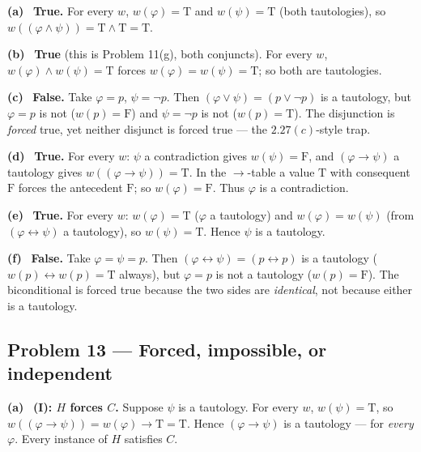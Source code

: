 \documentclass[11pt]{article}
\newcommand{\T}{\mathrm{T}}
\newcommand{\F}{\mathrm{F}}
\newcommand{\solpart}[1]{\smallskip\noindent\textbf{(#1)}\ }
\newcommand{\prob}[2]{\subsection*{Problem #1 --- #2}}
\begin{document}
\solpart{a} \textbf{True.} For every $w$, $w(\varphi)=\T$ and $w(\psi)=\T$ (both
tautologies), so $w((\varphi\land\psi))=\T\land\T=\T$.

\solpart{b} \textbf{True} (this is Problem 11(g), both conjuncts). For every $w$,
$w(\varphi)\land w(\psi)=\T$ forces $w(\varphi)=w(\psi)=\T$; so both are tautologies.

\solpart{c} \textbf{False.} Take $\varphi=p$, $\psi=\lnot p$. Then $(\varphi\lor
\psi)=(p\lor\lnot p)$ is a tautology, but $\varphi=p$ is not ($w(p)=\F$) and
$\psi=\lnot p$ is not ($w(p)=\T$). The disjunction is \emph{forced} true, yet
neither disjunct is forced true --- the $2.27(c)$-style trap.

\solpart{d} \textbf{True.} For every $w$: $\psi$ a contradiction gives $w(\psi)=\F$,
and $(\varphi\to\psi)$ a tautology gives $w((\varphi\to\psi))=\T$. In the
$\to$-table a value $\T$ with consequent $\F$ forces the antecedent $\F$; so
$w(\varphi)=\F$. Thus $\varphi$ is a contradiction.

\solpart{e} \textbf{True.} For every $w$: $w(\varphi)=\T$ ($\varphi$ a tautology)
and $w(\varphi)=w(\psi)$ (from $(\varphi\leftrightarrow\psi)$ a tautology), so
$w(\psi)=\T$. Hence $\psi$ is a tautology.

\solpart{f} \textbf{False.} Take $\varphi=\psi=p$. Then $(\varphi\leftrightarrow
\psi)=(p\leftrightarrow p)$ is a tautology ($w(p)\leftrightarrow w(p)=\T$ always),
but $\varphi=p$ is not a tautology ($w(p)=\F$). The biconditional is forced true
because the two sides are \emph{identical}, not because either is a tautology.

\prob{13}{Forced, impossible, or independent}

\solpart{a} \textbf{(I): $H$ forces $C$.} Suppose $\psi$ is a tautology. For every
$w$, $w(\psi)=\T$, so $w((\varphi\to\psi))=w(\varphi)\to\T=\T$. Hence
$(\varphi\to\psi)$ is a tautology --- for \emph{every} $\varphi$. Every instance of
$H$ satisfies $C$.
\end{document}
